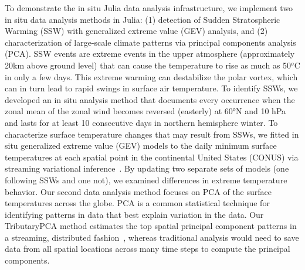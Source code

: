\documentclass{juliacon}
\begin{document}
To demonstrate the in situ Julia data analysis infrastructure, we implement two in situ data analysis methods in Julia: (1) detection of Sudden Stratospheric Warming (SSW) with generalized extreme value (GEV) analysis, and (2) characterization of large-scale climate patterns via principal components analysis (PCA). SSW events are extreme events in the upper atmosphere (approximately 20km above ground level) that can cause the temperature to rise as much as 50$^o$C in only a few days.  This extreme warming can destabilize the polar vortex, which can in turn lead to rapid swings in surface air temperature. To identify SSWs, we developed an in situ analysis method that documents every occurrence when the zonal mean of the zonal wind becomes reversed (easterly) at 60°N and 10 hPa and lasts for at least 10 consecutive days in northern hemisphere winter. To characterize surface temperature changes that may result from SSWs, we fitted in situ generalized extreme value (GEV) models to the daily minimum surface temperatures at each spatial point in the continental United States (CONUS) via streaming variational inference~\cite{broderick2013streaming}. By updating two separate sets of models (one following SSWs and one not), we examined differences in extreme temperature behavior. Our second data analysis method focuses on PCA of the surface temperatures across the globe. PCA is a common statistical technique for identifying patterns in data that best explain variation in the data. Our TributaryPCA method estimates the top spatial principal component patterns in a streaming, distributed fashion~\cite{wang2021tributarypca}, whereas traditional analysis would need to save data from all spatial locations across many time steps to compute the principal components.
\end{document}
